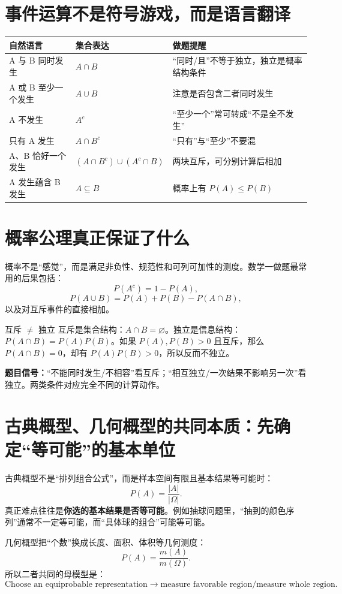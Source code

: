 \documentclass[11pt,a4paper,openany]{ctexbook}
\newcommand{\key}[1]{\textbf{\color{deep}#1}}
\begin{document}
\section{事件运算不是符号游戏，而是语言翻译}
\begin{longtable}{p{3.0cm}p{4.5cm}p{\dimexpr\linewidth-8.35cm\relax}}
\toprule
\textbf{自然语言} & \textbf{集合表达} & \textbf{做题提醒}\\
\midrule
A 与 B 同时发生 & $A\cap B$ & “同时/且”不等于独立，独立是概率结构条件\\
A 或 B 至少一个发生 & $A\cup B$ & 注意是否包含二者同时发生\\
A 不发生 & $A^c$ & “至少一个”常可转成“不是全不发生”\\
只有 A 发生 & $A\cap B^c$ & “只有”与“至少”不要混\\
A、B 恰好一个发生 & $(A\cap B^c)\cup(A^c\cap B)$ & 两块互斥，可分别计算后相加\\
A 发生蕴含 B 发生 & $A\subseteq B$ & 概率上有 $P(A)\le P(B)$\\
\bottomrule
\end{longtable}

\section{概率公理真正保证了什么}
概率不是“感觉”，而是满足非负性、规范性和可列可加性的测度。数学一做题最常用的后果包括：
\[
P(A^c)=1-P(A),
\]
\[
P(A\cup B)=P(A)+P(B)-P(A\cap B),
\]
以及对互斥事件的直接相加。

\begin{boundarybox}{互斥 $\neq$ 独立}
互斥是集合结构：$A\cap B=\varnothing$。独立是信息结构：$P(A\cap B)=P(A)P(B)$。如果 $P(A),P(B)>0$ 且互斥，那么 $P(A\cap B)=0$，却有 $P(A)P(B)>0$，所以反而不独立。

\textbf{题目信号：}“不能同时发生/不相容”看互斥；“相互独立/一次结果不影响另一次”看独立。两类条件对应完全不同的计算动作。
\end{boundarybox}

\section{古典概型、几何概型的共同本质：先确定“等可能”的基本单位}
古典概型不是“排列组合公式”，而是样本空间有限且基本结果等可能时：
\[
P(A)=\frac{\lvert A\rvert}{\lvert\Omega\rvert}.
\]
真正难点往往是\key{你选的基本结果是否等可能}。例如抽球问题里，“抽到的颜色序列”通常不一定等可能，而“具体球的组合”可能等可能。

几何概型把“个数”换成长度、面积、体积等几何测度：
\[
P(A)=\frac{m(A)}{m(\Omega)}.
\]
所以二者共同的母模型是：
\[
\boxed{\text{Choose an equiprobable representation}\to\text{measure favorable region}/\text{measure whole region}.}
\]
\end{document}
